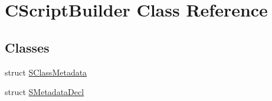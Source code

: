 \hypertarget{class_c_script_builder}{}\section{C\+Script\+Builder Class Reference}
\label{class_c_script_builder}
\subsection*{Classes}
\begin{DoxyCompactItemize}
\item 
struct \hyperlink{struct_c_script_builder_1_1_s_class_metadata}{S\+Class\+Metadata}
\item 
struct \hyperlink{struct_c_script_builder_1_1_s_metadata_decl}{S\+Metadata\+Decl}
\end{DoxyCompactItemize}
